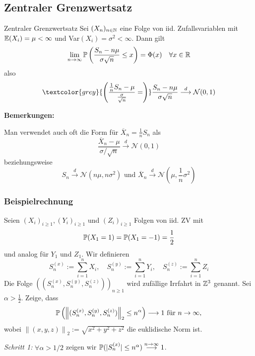 \subsection{Zentraler Grenzwertsatz}
\begin{mainbox}{Zentraler Grenzwertsatz}
    Sei $(X_n)_{n\in \N}$ eine Folge von iid. Zufallsvariablen mit $\E(X_i) = \mu < \infty$ und Var$(X_i) = \sigma^2 < \infty$.
    Dann gilt 
    $$\limn \P\left(\frac{S_n - n \mu}{\sigma \sqrt{n}} \leq x\right) = \Phi(x) \quad \forall x \in \R$$
    also
    $$\textcolor{grey}{\left(\frac{\frac{1}{n} S_{n} - \mu}{\frac{\sigma}{\sqrt{n}}} =\right)}\frac{S_n - n \mu}{\sigma \sqrt{n}} \overset{d}{\longrightarrow} \mathcal{N}(0,1)$$
\end{mainbox}
\textbf{Bemerkungen: }

Man verwendet auch oft die Form für $\overline{X}_n = \frac{1}{n}S_n$ als
\begin{equation}
	\frac{\overline{X}_n - \mu}{\sigma / \sqrt{n}} \overset{d}{\longrightarrow} \mathcal{N}(0,1) \tag{$\star$}
\end{equation}
beziehungsweise
\begin{equation}
	S_n \overset{d}{\longrightarrow} \mathcal{N}(n\mu, n \sigma^2) \text{ und } \overline{X}_n \overset{d}{\longrightarrow} \mathcal{N}\left(\mu, \frac{1}{n}\sigma^2\right)\tag{$\star$}
\end{equation}

\subsubsection*{Beispielrechnung}

Seien $(X_i)_{i \geq 1}, (Y_i)_{i \geq 1}$ und $(Z_i)_{i \geq 1}$ Folgen von iid. ZV mit
$$\P(X_1 = 1) = \P(X_1 = -1) = \frac{1}{2}$$
und analog für $Y_1$ und $Z_1$. Wir definieren
$$S_n^{(x)} := \sum_{i=1}^n X_i, \quad S_n^{(y)} := \sum_{i=1}^n Y_i, \quad S_n^{(z)} := \sum_{i=1}^n Z_i$$
Die Folge $\left((S_n^{(x)}, S_n^{(y)}, S_n^{(z)})\right)_{n \geq 1}$ wird zufällige Irrfahrt in $\Z^3$ genannt. Sei $\alpha > \frac{1}{2}$. Zeige, dass
$$\P\left(\left\lVert(S_n^{(x)}, S_n^{(y)}, S_n^{(z)})\right\rVert_2 \leq n^\alpha\right) \longrightarrow 1 \text{ für } n \to \infty,$$
wobei $\left\lVert(x,y,z)\right\rVert_2 := \sqrt{x^2+y^2+z^2}$ die euklidische Norm ist.

\textit{Schritt 1: }$\forall \alpha > 1/2$ zeigen wir $\P(|S_n^{(x)}| \leq n^\alpha) \overset{n \to \infty}{\longrightarrow} 1$.


